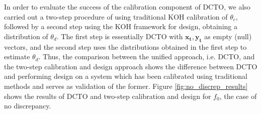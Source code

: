 \documentclass[12pt]{article}
\begin{document}
%
In order to evaluate the success of the calibration component of DCTO, we also carried out a two-step procedure of using traditional KOH calibration of $\theta_c$, followed by a second step using the KOH framework for design, obtaining a distribution of $\theta_d$. 
%
The first step is essentially DCTO with $\mathbf{x_t},\mathbf{y_t}$ as empty (null) vectors, and the second step uses the distributions obtained in the first step to estimate $\theta_d$.
%
Thus, the comparison between the unified approach, i.e. DCTO, and the two-step calibration and design approach shows the difference between DCTO and performing design on a system which has been calibrated using traditional methods and serves as validation of the former.
%
Figure \ref{fig:no_discrep_results} shows the results of DCTO and two-step calibration and design for $f_0$, the case of no discrepancy.
%
\end{document}

